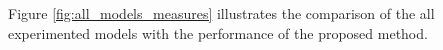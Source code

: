 \documentclass[sn-mathphys,Numbered]{sn-jnl}
\theoremstyle{thmstyleone}
\theoremstyle{thmstyletwo}
\theoremstyle{thmstylethree}
\begin{document}

Figure \ref{fig:all_models_measures} illustrates the comparison of the all experimented models with the performance of the proposed method. 
\end{document}

